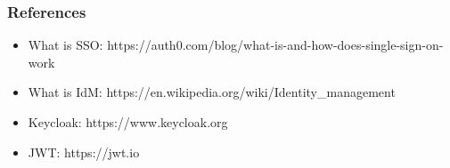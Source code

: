 \documentclass{beamer}
\begin{document}
\begin{frame}
  \frametitle{References}

  \begin{itemize}
    \item What is SSO: https://auth0.com/blog/what-is-and-how-does-single-sign-on-work
    \item What is IdM: https://en.wikipedia.org/wiki/Identity\_management
    \medskip
    \item Keycloak: https://www.keycloak.org
    \item JWT: https://jwt.io
  \end{itemize}
\end{frame}
\end{document}
